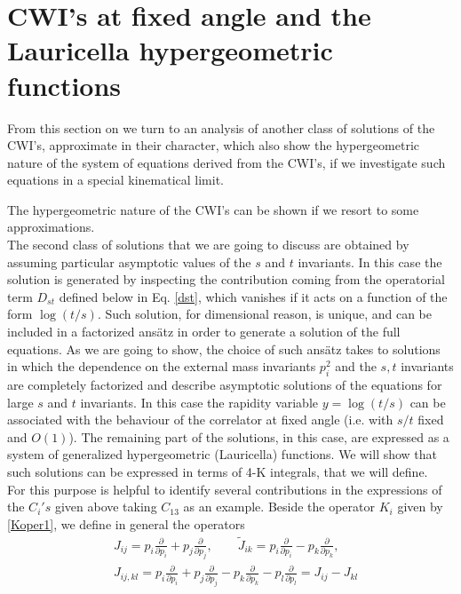 \documentclass[a4paper,11pt,openright,twoside]{book}
\numberwithin{equation}{section}
\begin{document}
{\section{CWI's at fixed angle  and the Lauricella hypergeometric functions}
From this section on we turn to an analysis of another class of solutions of the CWI's, approximate in their character, which also show the hypergeometric nature of the system of equations derived from the CWI's, if we investigate such equations in a special kinematical limit. 

The hypergeometric nature of the CWI's can be shown if we resort to some approximations. \\
The second class of solutions that we are going to discuss are obtained by assuming particular asymptotic values of the $s$ and $t$ invariants. In this case the solution is generated by inspecting the contribution coming from the operatorial term $D_{s t} $ defined below in Eq. \eqref{dst}, which vanishes if it acts on a function of the form $\log(t/s)$. Such solution, for dimensional reason, is unique, and can be included in a factorized ans\"atz in order to generate a solution of the full equations. As we are going to show, the choice of such ans\"atz takes to solutions in which the dependence on the external mass invariants $p_i^2$ and the $s,t$ invariants are completely factorized and describe asymptotic solutions of the equations for large $s$ and $t$ invariants. In this case the rapidity variable $y=\log(t/s)$ can be associated with the behaviour of the correlator at fixed angle (i.e. with $s/t$ fixed and $O(1)$). The remaining part of the solutions, in this case, are expressed as a system of generalized hypergeometric (Lauricella) functions. We will show that such solutions can be expressed in terms of 4-K integrals, that we will define. \\   
For this purpose is helpful to identify several contributions in the expressions of the $C_i's$ given above taking $C_{13}$ as an example. Beside the operator ${K}_i$ given by \eqref{Koper1}, we define in general the operators
\begin{align}
	&J_{ij}=p_i\frac{\partial}{\partial p_i}+p_j\frac{\partial}{\partial p_j}, \qquad \tilde{J}_{ik}=p_i\frac{\partial}{\partial p_i}-p_k\frac{\partial}{\partial p_k} ,
	\label{firstref}\\[1.2ex]
	&J_{ij,kl}=p_i\frac{\partial}{\partial p_i}+p_j\frac{\partial}{\partial p_j}-p_k\frac{\partial}{\partial p_k}-p_l\frac{\partial}{\partial p_l}=J_{ij}-J_{kl}
\end{align}
}
\end{document}
